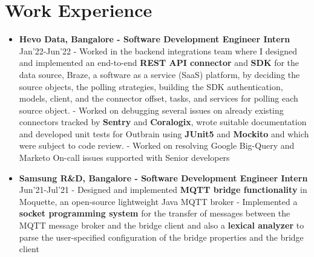 \documentclass{article}
\begin{document}
\section*{Work Experience}

\begin{itemize}

    \item{\textbf{\large{Hevo Data, Bangalore - Software Development Engineer Intern}}} \hfill \textmd{Jan'22-Jun'22}
          \newline
          \textmd{- Worked in the backend integrations team where I designed and implemented an end-to-end \textbf{REST API connector} and \textbf{SDK} for the data source, Braze, a software as a service (SaaS) platform, by deciding the source objects, the polling strategies, building the SDK authentication, models, client, and the connector offset, tasks, and services for polling each source object.}
          \newline
          \textmd{- Worked on debugging several issues on already existing connectors tracked by \textbf{Sentry} and \textbf{Coralogix}, wrote suitable documentation and developed unit tests for Outbrain using \textbf{JUnit5} and \textbf{Mockito} and which were subject to code review.}
          \newline 
          \textmd{- Worked on resolving Google Big-Query and Marketo On-call issues supported with Senior developers}

    \item{\textbf{\large{Samsung R\&D, Bangalore - Software Development Engineer Intern}}} \hfill \textmd{Jun'21-Jul'21}
          \newline
          \textmd{- Designed and implemented \textbf{MQTT bridge functionality} in Moquette, an open-source lightweight Java MQTT broker}
          \newline
          \textmd{- Implemented a \textbf{socket programming system} for the transfer of messages between the MQTT message broker and the bridge client and also a \textbf{lexical analyzer} to parse the user-specified configuration of the bridge properties and the bridge client}


\end{itemize}
\end{document}

